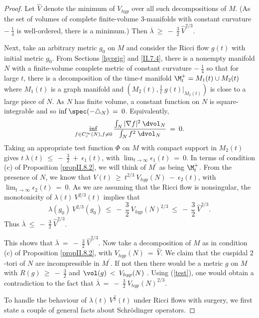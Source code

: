 \begin{proof}
Let $\widehat{V}$ denote the minimum of $V_{hyp}$ over
all such decompositions of $M$. (As the set of
volumes of complete finite-volume $3$-manifolds with constant curvature
$- \: \frac14$ is well-ordered, there is a minimum.)
Then
$\overline{\lambda} \: \ge \:
- \: \frac32 \: \widehat{V}^{2/3}$.

Next, take an arbitrary metric
$g_0$ on $M$ and consider the Ricci flow $g(t)$ with initial metric $g_0$.
From Sections \ref{hyprig} and \ref{II.7.4}, there is a
nonempty manifold $N$ with a finite-volume complete metric
of constant curvature $- \: \frac14$
so that for large $t$, there is a decomposition of the time-$t$ manifold
$\M^+_t = M_1(t) \cup M_2(t)$
where $M_1(t)$ is a graph manifold and $(M_2(t), \frac{1}{t} \: g(t) \big|_{M_2(t)})$
is close to a large
piece of $N$.
As $N$ has finite volume, a constant function on $N$ is square-integrable
and so  $\inf \spec(- \triangle_N) \: = \: 0$.
Equivalently,
\begin{equation}
\inf_{f \in C^\infty_c(N), f \neq 0}
\frac{\int_N |\nabla f|^2 \: \dvol_N}{\int_N f^2 \: \dvol_N} \: = \: 0.
\end{equation}
Taking an appropriate test function $\Phi$ on $M$ with compact
support in $M_2(t)$
gives $t \: \lambda(t) \: \le \: - \:
\frac32 \: + \: \epsilon_1(t)$, with $\lim_{t \rightarrow \infty}
\epsilon_1(t) \: = \: 0$. In terms of condition (c) of Proposition \ref{propII.8.2},
we will think of $M^\prime$ as being $\M^+_t$.
From the presence of $N$, we know that $V(t) \: \ge \:
t^{2/3} \: V_{hyp}(N) \: - \: \epsilon_2(t)$, with $\lim_{t \rightarrow \infty}
\epsilon_2(t) \: = \: 0$. As we are assuming that the Ricci flow is nonsingular,
the monotonicity of
$\lambda(t) \: V^{2/3}(t)$ implies that
\begin{equation}
\lambda(g_0) \: V^{2/3}(g_0) \: \le \: - \: \frac32 \: V_{hyp}(N)^{2/3}
 \: \le \: - \: \frac32 \: \widehat{V}^{2/3}.
 \end{equation}
Thus $\overline{\lambda} \: \le \: - \: \frac32 \: \widehat{V}^{2/3}$.

This shows that
$\overline{\lambda} \: = \: - \: \frac32 \: \widehat{V}^{2/3}$.
Now take a decomposition of $M$ as in condition (c) of Proposition \ref{propII.8.2},
with
$V_{hyp}(N) \: = \: \widehat{V}$. We claim that the cuspidal $2$-tori of $N$ are
incompressible in $M^\prime$. If not
then there would be a metric $g$ on $M$ with $R(g) \: \ge \: - \: \frac32$ and
$\vol(g) \: < \: V_{hyp}(N)$ \cite[Pf. of Theorem 2.9]{Anderson}.
Using (\ref{test}), one
would obtain a contradiction to the fact that
$\overline{\lambda} \: = \: - \: \frac32 \: V_{hyp}(N)^{2/3}$.

To handle the behaviour of $\lambda(t) \: V^{\frac23}(t)$ under
Ricci flows with surgery, we
first state a couple of general facts about
Schr\"odinger operators.

\end{proof}
